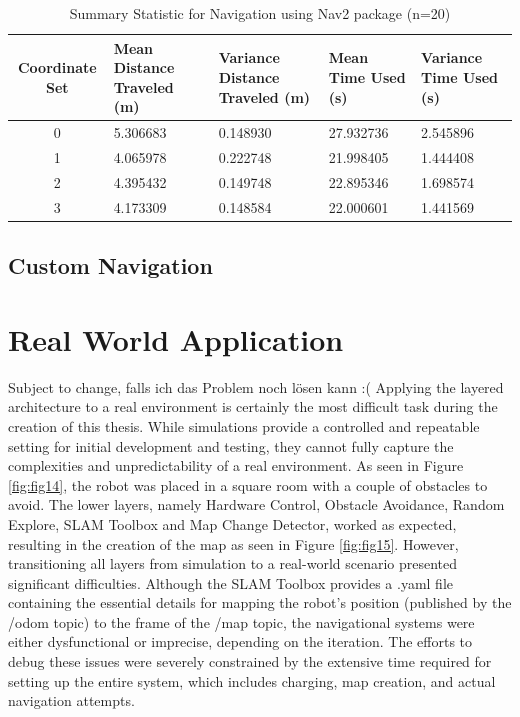 \documentclass[%
paper=A4,               %
twoside=true,           %
openright,              %
11pt,                   %
bibliography=totoc,     %
titlepage=on,           %
DIV=12,                 %
BCOR=1.5cm,             %
parskip=half,            %
final
]{scrreprt}
\begin{document}
	\begin{table}[H]
		\centering
		\begin{tabular}{|c|p{3cm}|p{3cm}|p{3cm}|p{3cm}|}
			\hline
			Coordinate Set & Mean Distance \newline Traveled (m) & Variance Distance \newline Traveled (m) & Mean Time \newline Used (s) & Variance Time \newline Used (s) \\
			\hline
			0 & 5.306683 & 0.148930 & 27.932736 & 2.545896 \\
			1 & 4.065978 & 0.222748 & 21.998405 & 1.444408 \\
			2 & 4.395432 & 0.149748 & 22.895346 & 1.698574 \\
			3 & 4.173309 & 0.148584 & 22.000601 & 1.441569 \\
			\hline
		\end{tabular}
		\caption{Summary Statistic for Navigation using Nav2 package (n=20)}
		\label{tab:1}
	\end{table}
	
	
	\subsection{Custom Navigation}
	
	
	\section{Real World Application} 
	{\color{red} Subject to change, falls ich das Problem noch lösen kann :( }
	Applying the layered architecture to a real environment is certainly the most difficult task during the creation of this thesis. While simulations provide a controlled and repeatable setting for initial development and testing, they cannot fully capture the complexities and unpredictability of a real environment. As seen in Figure \ref{fig:fig14}, the robot was placed in a square room with a couple of obstacles to avoid. The lower layers, namely Hardware Control, Obstacle Avoidance, Random Explore, SLAM Toolbox and Map Change Detector, worked as expected, resulting in the creation of the map as seen in Figure \ref{fig:fig15}. However, transitioning all layers from simulation to a real-world scenario presented significant difficulties. Although the SLAM Toolbox provides a .yaml file containing the essential details for mapping the robot's position (published by the /odom topic) to the frame of the /map topic, the navigational systems were either dysfunctional or imprecise, depending on the iteration. The efforts to debug these issues were severely constrained by the extensive time required for setting up the entire system, which includes charging, map creation, and actual navigation attempts.
	
\end{document}
